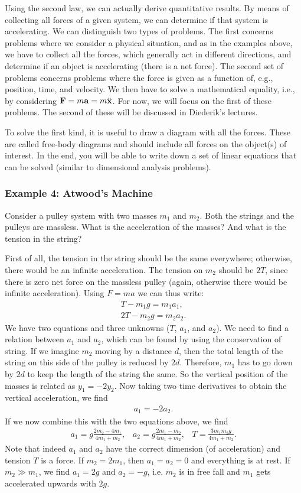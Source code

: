 \documentclass[12pt]{article}
\newcommand{\be}{\begin{eqnarray}}
\newcommand{\ee}{\end{eqnarray}}
\begin{document}
Using the second law, we can actually derive quantitative results. By means of collecting all forces of a given system, we can determine if that system is accelerating. We can distinguish two types of problems. The first concerns problems where we consider a physical situation, and as in the examples above, we have to collect all the forces, which generally act in different directions, and determine if an object is accelerating (there is a net force). The second set of problems concerns problems where the force is given as a function of, e.g., position, time, and velocity. We then have to solve a mathematical equality, i.e., by considering ${\bf F} = m {\bf a} = m \ddot{\bf x}$. For now, we will focus on the first of these problems. The second of these will be discussed in Diederik's lectures.  

To solve the first kind, it is useful to draw a diagram with all the forces. These are called free-body diagrams and should include all forces on the object(s) of interest. In the end, you will be able to write down a set of linear equations that can be solved (similar to dimensional analysis problems). 


\subsubsection*{Example 4: Atwood's Machine} 

Consider a pulley system with two masses $m_1$ and $m_2$. Both the strings and the pulleys are massless. What is the acceleration of the masses? And what is the tension in the string? 

First of all, the tension in the string should be the same everywhere; otherwise, there would be an infinite acceleration. The tension on $m_2$ should be $2T$, since there is zero net force on the massless pulley (again, otherwise there would be infinite acceleration). Using $F = ma$ we can thus write:
\be
T - m_1 g  = m_1 a_1, \\
2T - m_2 g = m_2 a_2.
\ee
We have two equations and three unknowns ($T$, $a_1$, and $a_2$). We need to find a relation between $a_1$ and $a_2$, which can be found by using the conservation of string. If we imagine $m_2$ moving by a distance $d$, then the total length of the string on this side of the pulley is reduced by $2d$. Therefore, $m_1$ has to go down by $2d$ to keep the length of the string the same. So the vertical position of the masses is related as $y_1 = -2 y_2$. Now taking two time derivatives to obtain the vertical acceleration, we find 
\be
a_1 = - 2 a_2. 
\ee
If we now combine this with the two equations above, we find 
\be
a_1 = g \frac{2m_2-4m_1}{4m_1+m_2}, \;\;\; a_2 = g \frac{2m_1-m_2}{4m_1+m_2}, \;\;\; T = \frac{3 m_1 m_2 g} {4 m_1 + m_2}.
\ee
Note that indeed $a_1$ and $a_2$ have the correct dimension (of acceleration) and tension $T$ is a force. If $m_2 = 2m_1$, then $a_1 = a_2 = 0$ and everything is at rest. If $m_2 \gg m_1$, we find $a_1 = 2g$ and $a_2 = -g$, i.e. $m_2$ is in free fall and $m_1$ gets accelerated upwards with $2g$. 
\end{document}
